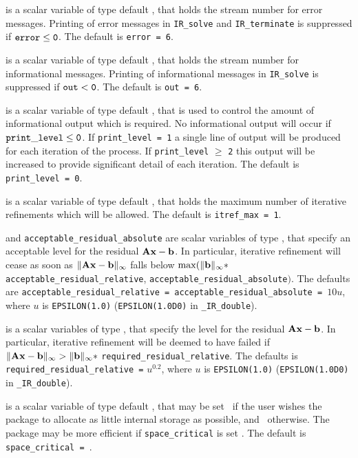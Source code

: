 \documentclass{galahad}
\newcommand{\packagename}{IR}
\newcommand{\fullpackagename}{\libraryname\_\-\packagename}
\begin{document}
\begin{description}
 is a scalar variable of type default \integer, that holds the
stream number for error messages.
Printing of error messages in
{\tt \packagename\_solve} and {\tt \packagename\_terminate}
is suppressed if ${\tt error} \leq {\tt 0}$.
The default is {\tt error = 6}.

 is a scalar variable of type default \integer, that holds the
stream number for informational messages.
Printing of informational messages in
{\tt \packagename\_solve} is suppressed if ${\tt out} < {\tt 0}$.
The default is {\tt out = 6}.

 is a scalar variable of type default \integer,
that is used
to control the amount of informational output which is required. No
informational output will occur if ${\tt print\_level} \leq {\tt 0}$. If
{\tt print\_level = 1} a single line of output will be produced for each
iteration of the process. If {\tt print\_level} $\geq$ {\tt 2} this output
will be increased to provide significant detail of each iteration.
The default is {\tt print\_level = 0}.

 is a scalar variable of type default \integer, that holds
the maximum number of iterative refinements which will be allowed.
The default is {\tt itref\_max = 1}.

  and {\tt acceptable\_residual\_absolute}
are scalar variables of type \realdp, that
specify an acceptable level for the residual ${\mathbf{A}} {\mathbf{x}} - {\mathbf{b}}$.
In particular, iterative refinement will cease as soon as
$\|{\mathbf{A}} {\mathbf{x}} - {\mathbf{b}}\|_{\infty}$ falls below
$\max (\| {\mathbf{b}}\|_{\infty} \ast$ {\tt acceptable\_residual\_relative},
{\tt acceptable\_residual\_absolute}$)$.
The defaults are {\tt acceptable\_residual\_relative =}{\tt
acceptable\_resi\-dual\_absolute = }$10 u$,
where $u$ is {\tt EPSILON(1.0)} ({\tt EPSILON(1.0D0)} in
{\tt \fullpackagename\_double}).

 is a scalar variables of type \realdp, that
specify the level for the residual ${\mathbf{A}} {\mathbf{x}} - {\mathbf{b}}$.
In particular, iterative refinement will be deemed to have failed if
$\|{\mathbf{A}} {\mathbf{x}} - {\mathbf{b}}\|_{\infty} >
 \| {\mathbf{b}}\|_{\infty} \ast$ {\tt required\_residual\_relative}.
The defaults is {\tt required\_residual\_relative =} $u^{0.2}$,
where $u$ is {\tt EPSILON(1.0)} ({\tt EPSILON(1.0D0)} in
{\tt \fullpackagename\_double}).

 is a scalar variable of type default \logical, that
may be set \true\ if the user wishes the package to allocate as little
internal storage as possible, and \false\ otherwise. The package may
be more efficient if {\tt space\_critical} is set \false.
The default is {\tt space\_critical = \false}.


\end{description}
\end{document}
